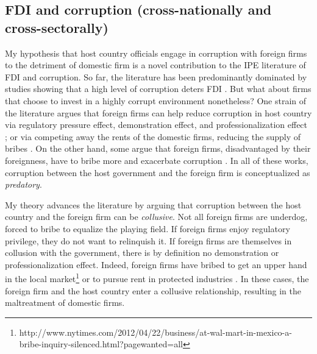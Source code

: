 \subsection{FDI and corruption (cross-nationally and cross-sectorally)}

My hypothesis that host country officials engage in corruption with foreign firms to the detriment of domestic firm is a novel contribution to the IPE literature of FDI and corruption. So far, the literature has been predominantly dominated by studies showing that a high level of corruption deters FDI \citep{Wei2000, Hakkala2008, Al-Sadig2009}. But what about firms that choose to invest in a highly corrupt environment nonetheless? One strain of the literature argues that foreign firms can help reduce corruption in host country via regulatory pressure effect, demonstration effect, and professionalization effect \citep{Kwok2006}; or via competing away the rents of the domestic firms, reducing the supply of bribes \citep{Sandholtz2003}. On the other hand, some argue that foreign firms, disadvantaged by their foreignness, have to bribe more and exacerbate corruption \citep{Hellman2002}. In all of these works, corruption between the host government and the foreign firm is conceptualized as \textit{predatory}.

My theory advances the literature by arguing that corruption between the host country and the foreign firm can be \textit{collusive}. Not all foreign firms are underdog, forced to bribe to equalize the playing field. If foreign firms enjoy regulatory privilege, they do not want to relinquish it. If foreign firms are themselves in collusion with the government, there is by definition no demonstration or professionalization effect. Indeed, foreign firms have bribed to get an upper hand in the local market\footnote{http://www.nytimes.com/2012/04/22/business/at-wal-mart-in-mexico-a-bribe-inquiry-silenced.html?pagewanted=all} or to pursue rent in protected industries \citep{Malesky2015}. In these cases, the foreign firm and the host country enter a collusive relationship, resulting in the maltreatment of domestic firms.

